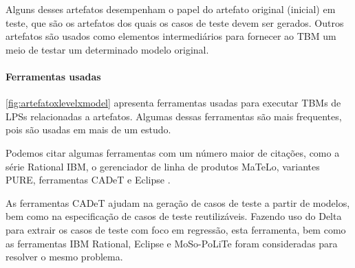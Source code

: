 Alguns desses artefatos desempenham o papel do artefato original (inicial) em teste, que são os artefatos dos quais os casos de teste devem ser gerados. Outros artefatos são usados como elementos intermediários para fornecer ao TBM um meio de testar um determinado modelo original.


\paragraph{\textbf{Ferramentas usadas}}

\ref{fig:artefatoxlevelxmodel} apresenta ferramentas usadas para executar TBMs de LPSs relacionadas a artefatos. Algumas dessas ferramentas são mais frequentes, pois são usadas em mais de um estudo.

Podemos citar algumas ferramentas com um número maior de citações, como a série Rational IBM, o gerenciador de linha de produtos MaTeLo, variantes PURE, ferramentas CADeT e Eclipse \cite{Olimpiew2008, SamihBogusch2014, Lity_et_al2012, beohar2014spinal, costa2016split}.

As ferramentas CADeT \cite{olimpiew2008model} ajudam na geração de casos de teste a partir de modelos, bem como na especificação de casos de teste reutilizáveis. Fazendo uso do Delta para extrair os casos de teste com foco em regressão, esta ferramenta, bem como as ferramentas IBM Rational, Eclipse \cite{lochau2012incremental} e MoSo-PoLiTe foram consideradas para resolver o mesmo problema.


